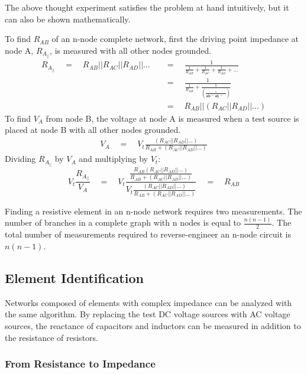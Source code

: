\documentclass[11pt,twoside]{mitthesis}
\begin{document}
The above thought experiment satisfies the problem at hand intuitively, but it can also be shown mathematically.

To find $R_{AB}$ of an n-node complete network, first the driving point impedance at node A, $R_{A_{||}}$, is measured with all other nodes grounded.
\begin{align*}
R_{A_{||}} 
\quad = \quad R_{AB}||R_{AC}||R_{AD}||... 
\quad &= \quad \frac{1}{\frac{1}{R_{AB}}+\frac{1}{R_{AC}}+\frac{1}{R_{AD}}+...}\\
\quad &= \quad \frac{1}{\frac{1}{R_{AB}}+\frac{1}
{(\frac{1}{\frac{1}{R_{AC}}+\frac{1}{R_{AD}}+...})}}\\
\quad &= \quad R_{AB}||(R_{AC}||R_{AD}||...)
\end{align*}
To find $V_A$ from node B, the voltage at node A is measured when a test source is placed at node B with all other nodes grounded.
\begin{align*}
V_A
\quad = \quad V_t \frac{(R_{AC}||R_{AD}||...)}{R_{AB}+(R_{AC}||R_{AD}||...)}
\end{align*}
Dividing $R_{A_{||}}$ by $V_A$ and multiplying by $V_t$:
\begin{equation*}
V_t \frac{R_{A_{||}}}{V_A}
\quad = \quad V_t \frac{\frac{R_{AB}(R_{AC}||R_{AD}||...)}{R_{AB}+(R_{AC}||R_{AD}||...)}}
	{V_t \frac{(R_{AC}||R_{AD}||...)}{R_{AB}+(R_{AC}||R_{AD}||...)}}
\quad = \quad R_{AB} 
\end{equation*}

Finding a resistive element in an n-node network requires two measurements. 
The number of branches in a complete graph with n nodes is equal to $\frac{n(n-1)}{2}$.
The total number of measurements required to reverse-engineer an n-node circuit is $n(n-1)$.


\subsection{Element Identification}

Networks composed of elements with complex impedance can be analyzed with the same algorithm.
By replacing the test DC voltage sources with AC voltage sources, the reactance of capacitors and inductors can be measured in addition to the resistance of resistors.

\subsubsection{From Resistance to Impedance}
\end{document}
